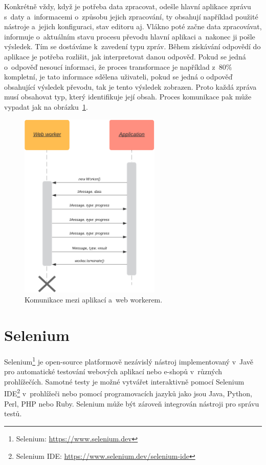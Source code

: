 Konkrétně vždy, když je potřeba data zpracovat, odešle hlavní aplikace zprávu s~daty a~informacemi o~způsobu jejich zpracování, ty obsahují například použité nástroje a~jejich konfiguraci, stav editoru aj. Vlákno poté začne data zpracovávat, informuje o~aktuálním stavu procesu převodu hlavní aplikaci a~nakonec ji pošle výsledek. Tím se dostáváme k~zavedení typu zpráv. Během získávání odpovědí do aplikace je potřeba rozlišit, jak interpretovat danou odpověď. Pokud se jedná o~odpověď nesoucí informaci, že proces transformace je například z~$80\%$ kompletní, je tato informace sdělena uživateli, pokud se jedná o odpověď obsahující výsledek převodu, tak je tento výsledek zobrazen. Proto každá zpráva musí obsahovat typ, který identifikuje její obsah. Proces komunikace pak může vypadat jak na obrázku~\ref{obr:Komunikace mezi aplikací a web workerem}.

\begin{figure}[hbt]
	\centering
	\setlength{\fboxsep}{0pt}
	\includegraphics[width=0.6\textwidth]{obrazky-figures/app-worker_komunikace.pdf}
	\caption{Komunikace mezi aplikací a~web workerem.}
	\label{obr:Komunikace mezi aplikací a web workerem}
\end{figure}

\section{Selenium}
\label{sec:Selenium}
Selenium\footnote{Selenium: \url{https://www.selenium.dev}} \cite{website:Selenium} je open-source platformově nezávislý nástroj implementovaný v~Javě pro automatické testování webových aplikací nebo e-shopů v~různých prohlížečích. Samotné testy je možné vytvářet interaktivně pomocí Selenium IDE\footnote{Selenium IDE: \url{https://www.selenium.dev/selenium-ide}} v~prohlížeči nebo pomocí programovacích jazyků jako jsou Java, Python, Perl, PHP nebo Ruby. Selenium může být zároveň integrován nástroji pro správu testů.

